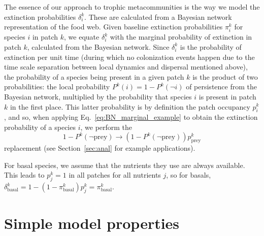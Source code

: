 \documentclass[11pt]{article}
\begin{document}
The essence of our approach to trophic metacommunities is the way we model the extinction probabilities $\delta_i^k$. These are calculated from a Bayesian network representation of the food web. Given baseline extinction probabilities $\pi_i^k$ for species $i$ in patch $k$, we equate $\delta_i^k$ with the marginal probability of extinction in patch $k$, calculated from the Bayesian network. Since $\delta_i^k$ is the probability of extinction per unit time (during which no colonization events happen due to the time scale separation between local dynamics and dispersal mentioned above), the probability of a species being present in a given patch $k$ is the product of two probabilities: the local probability $P^k(i) = 1 - P^k(\neg i)$ of persistence from the Bayesian network, multiplied by the probability that species $i$ is present in patch $k$ in the first place. This latter probability is by definition the patch occupancy $p_i^k$, and so, when applying Eq.~\ref{eq:BN_marginal_example} to obtain the extinction probability of a species $i$, we perform the
\begin{equation}
  \label{eq:bayesprob}
  1-P^k(\neg \text{prey}) \rightarrow (1-P^k(\neg \text{prey})) p_\text{prey}^k
\end{equation}
replacement (see Section~\ref{sec:anal} for example applications).

For basal species, we assume that the nutrients they use are always available. This leads to $p_j^k = 1$ in all patches for all nutrients $j$, so for basals, $\delta_{\text{basal}}^k = 1 - (1 - \pi_\text{basal}^k)p_j^k = \pi_\text{basal}^k$.


\section{Simple model properties} \label{sec:simpleprops}
\end{document}

